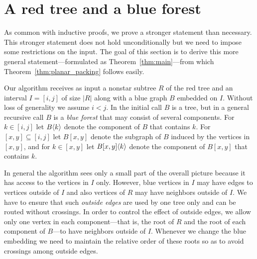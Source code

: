 \documentclass[11pt,a4paper,colorlinks=true,urlcolor=blue,citecolor=red]{article}
\theoremstyle{plain}
\begin{document}
\section{A red tree and a blue forest}\label{sec:preT2}

As common with inductive proofs, we prove a stronger statement than
necessary. This stronger statement does not hold
unconditionally but we need to impose some restrictions on the input.
The goal of this section is to derive this more general
statement---formulated as Theorem~\ref{thm:main}---from which
Theorem~\ref{thm:planar_packing} follows easily.

Our algorithm receives as input a nonstar subtree $R$ of the red tree
and an interval $I=[i,j]$ of size $|R|$ along with a blue graph $B$
embedded on $I$. Without loss of generality we assume $i<j$. In the
initial call $B$ is a tree, but in a general recursive call $B$ is a
\emph{blue forest} that may consist of several components. For
$k\in[i,j]$ let $B\langle{k}\rangle$ denote the component of $B$ that contains
$k$. For $[x,y]\subseteq[i,j]$ let $B[x,y]$ denote the subgraph of $B$
induced by the vertices in $[x,y]$, and for $k\in[x,y]$ let $B{[x,y]}\langle{k}\rangle$ denote the
component of $B[x,y]$ that contains $k$.



In general the algorithm sees only a small part of the overall picture
because it has access to the vertices in $I$ only. However, blue
vertices in $I$ may have edges to vertices outside of $I$ and also
vertices of $R$ may have neighbors outside of $I$. We have to ensure
that such \emph{outside edges} are used by one tree only and can be
routed without crossings.
In order to control the effect of outside edges, we allow only one
vertex in each component---that is, the root of $R$ and the root of each
component of $B$---to have neighbors outside of $I$. Whenever we change
the blue embedding we need to maintain the relative order of these roots
so as to avoid crossings among outside edges.
\end{document}
